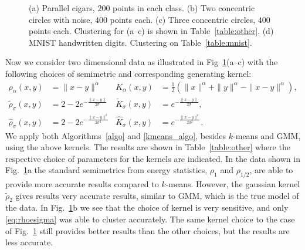 \documentclass[aps,preprint,nofootinbib,floatfix]{revtex4-1}
\newcommand\kk{K}
\begin{document}
\begin{figure}
\begin{minipage}{0.22\textwidth}
\end{minipage}
\caption{\label{fig:other}
(a) Parallel cigars, $200$ points in each class. (b) Two  
concentric
circles with noise, $400$ points each. (c) Three
concentric circles, $400$ points each.
Clustering for (a--c) is shown in Table~\ref{table:other}.
(d) MNIST handwritten digits. Clustering on Table~\ref{table:mnist}.
}
\end{figure}

Now we consider two dimensional data as illustrated in
Fig~\ref{fig:other}(a--c)
with the following choices of semimetric and corresponding generating kernel:
\begin{align}
\rho_{\alpha}(x,y) &= \| x - y\|^\alpha & 
\kk_{\alpha}(x,y) &= \tfrac{1}{2}\left(
\| x \|^\alpha +
\| y \|^\alpha -
\| x-y \|^\alpha \right) ,
\label{eq:rhoalpha} \\
%
\widetilde{\rho}_{\sigma}(x,y) &= 2 - 2 e^{-\tfrac{\|x-y\|}{2 \sigma}} &
\widetilde{\kk}_{\sigma}(x,y) &= e^{-\tfrac{\|x-y\|}{2\sigma}} ,
\label{eq:rhoesigma} \\
%
\widehat{\rho}_{\sigma}(x,y) &= 2 - 2 e^{-\tfrac{\|x-y\|^2}{2 \sigma^2}} &
\widehat{\kk}_{\sigma}(x,y) &= e^{-\tfrac{\|x-y\|^2}{2\sigma^2}} .
\label{eq:rhogsigma} 
\end{align}
We apply both Algorithms~\ref{algo} and \ref{kmeans_algo}, besides
$k$-means and GMM, using the above kernels. The results are shown
in Table~\ref{table:other} where the respective choice of parameters for the
kernels are indicated. In the data shown in Fig.~\ref{fig:other}a 
the standard semimetrics from energy statistics, $\rho_1$ and $\rho_{1/2}$, are
able to provide more accurate results compared to $k$-means. However,
the gaussian kernel $\widetilde{\rho}_2$ gives results very accurate
results, similar to GMM,
which is the true model of the data. In Fig.~\ref{fig:other}b we see
that the choice of kernel is very sensitive, and only \eqref{eq:rhoesigma}
was able to cluster accurately. The same kernel choice to the case
of Fig.~\ref{fig:other} still provides better results than
the other choices, but the results are less accurate.
\end{document}
